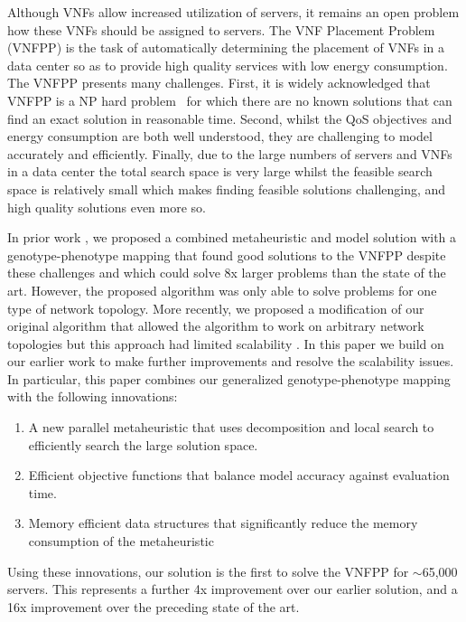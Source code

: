 Although VNFs allow increased utilization of servers, it remains an open problem how these VNFs should be assigned to servers. The VNF Placement Problem (VNFPP) is the task of automatically determining the placement of VNFs in a data center so as to provide high quality services with low energy consumption. The VNFPP presents many challenges. First, it is widely acknowledged that VNFPP is a NP hard problem~\cite{CohenLNR15,LuizelliCBG17,SangJGDY17} for which there are no known solutions that can find an exact solution in reasonable time. Second, whilst the QoS objectives and energy consumption are both well understood, they are challenging to model accurately and efficiently. Finally, due to the large numbers of servers and VNFs in a data center the total search space is very large whilst the feasible search space is relatively small \cite{BillingsleyLMMG22} which makes finding feasible solutions challenging, and high quality solutions even more so.

In prior work \cite{BillingsleyLMMG22}, we proposed a combined metaheuristic and model solution with a genotype-phenotype mapping that found good solutions to the VNFPP despite these challenges and which could solve 8x larger problems than the state of the art. However, the proposed algorithm was only able to solve problems for one type of network topology. More recently, we proposed a modification of our original algorithm that allowed the algorithm to work on arbitrary network topologies but this approach had limited scalability \cite{BillingsleyLMMG20}. In this paper we build on our earlier work to make further improvements and resolve the scalability issues. In particular, this paper combines our generalized genotype-phenotype mapping with the following innovations:

\begin{enumerate}
    \item A new parallel metaheuristic that uses decomposition and local search to efficiently search the large solution space.
    \item Efficient objective functions that balance model accuracy against evaluation time.
    \item Memory efficient data structures that significantly reduce the memory consumption of the metaheuristic
\end{enumerate}

Using these innovations, our solution is the first to solve the VNFPP for $\sim$65,000 servers. This represents a further 4x improvement over our earlier solution, and a 16x improvement over the preceding state of the art.

